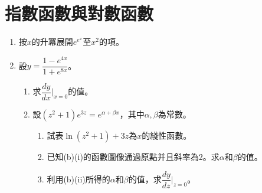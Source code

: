 \documentclass[12pt]{article}
\begin{document}
    \section{指數函數與對數函數}
    \begin{enumerate}
        \item 按$x$的升冪展開$e^{e^x}$至$x^2$的項。
        \item 設$y=\dfrac{1-e^{4x}}{1+e^{8x}}$。\begin{enumerate}
            \item 求$\dfrac{dy}{dx}\bigg|_{x=0}$的值。
            \item 設$(z^2+1)e^{3z}=e^{\alpha+\beta x}$，其中$\alpha,\beta$為常數。\begin{enumerate}
                \item 試表$\ln(z^2+1)+3z$為$x$的綫性函數。
                \item 已知(b)(i)的函數圖像通過原點并且斜率為2。求$\alpha$和$\beta$的值。
                \item 利用(b)(ii)所得的$\alpha$和$\beta$的值，求$\dfrac{dy}{dz}\bigg|_{z=0}$。
            \end{enumerate}
        \end{enumerate}
    \end{enumerate}
\end{document}
